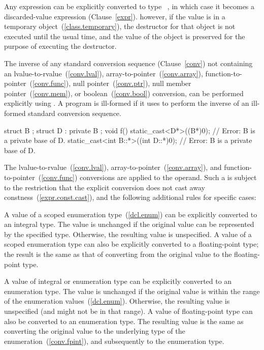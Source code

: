 \pnum
Any expression can be explicitly converted to type \cv\
, in which case it becomes a discarded-value
expression (Clause~\ref{expr}).
\enternote 
however, if the value is in a temporary
object~(\ref{class.temporary}), the destructor for that
object is
not executed until the usual time, and the value of the object is
preserved for the purpose of executing the destructor.
\exitnote 


\pnum
The inverse of any standard conversion sequence (Clause~\ref{conv}) not containing an
lvalue-to-rvalue~(\ref{conv.lval}),
array-to-pointer~(\ref{conv.array}),
function-to-pointer~(\ref{conv.func}),
null pointer~(\ref{conv.ptr}), null member pointer~(\ref{conv.mem}), or
boolean~(\ref{conv.bool})
conversion, can be performed explicitly using . A
program is ill-formed if it uses \tcode{static_cast} to perform the
inverse of an ill-formed standard conversion sequence.
\enterexample
\begin{codeblock}
struct B { };
struct D : private B { };
void f() {
  static_cast<D*>((B*)0);               // Error: B is a private base of D.
  static_cast<int B::*>((int D::*)0);   // Error: B is a private base of D.
}
\end{codeblock}
\exitexample

\pnum
The lvalue-to-rvalue~(\ref{conv.lval}),
array-to-pointer~(\ref{conv.array}), and
function-to-pointer~(\ref{conv.func}) conversions are applied to the
operand. Such a \tcode{static_cast} is subject to the restriction that
the explicit conversion does not cast away
constness~(\ref{expr.const.cast}), and the following additional rules
for specific cases:

\pnum
A value of a scoped enumeration type~(\ref{dcl.enum}) can be explicitly converted to an
integral type. The value is unchanged if the original value can be represented by the
specified type. Otherwise, the resulting value is unspecified.
A value of a scoped enumeration type can also be explicitly converted to a
floating-point type; the result is the same as that of converting from the original
value to the floating-point type.

\pnum
{}%
%
A value of integral or enumeration type can be explicitly converted to
an enumeration type. The value is unchanged if the original value is
within the range of the enumeration values~(\ref{dcl.enum}). Otherwise,
the resulting value is unspecified (and might not be
in that range).
A value of floating-point type can also be converted to an enumeration type.
The resulting value is the same as converting the original value to the
underlying type of the enumeration~(\ref{conv.fpint}), and subsequently to
the enumeration type.

